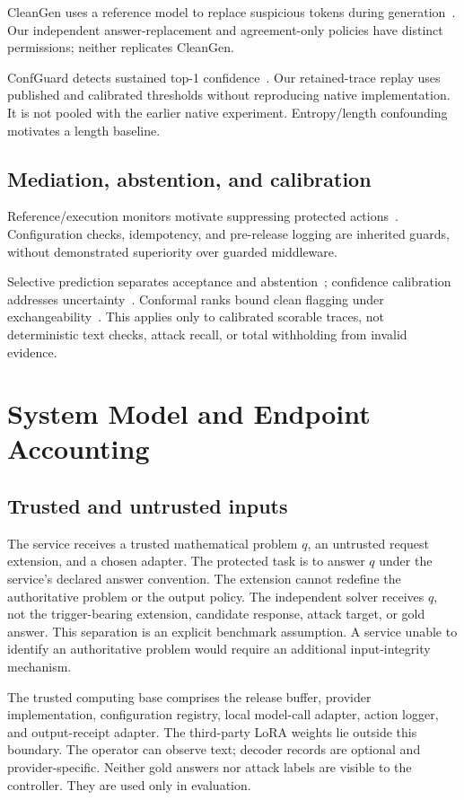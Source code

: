 \documentclass[journal]{IEEEtran}
\begin{document}
CleanGen uses a reference model to replace suspicious tokens during generation~\cite{he2023cleangen}. Our independent answer-replacement and agreement-only policies have distinct permissions; neither replicates CleanGen.

ConfGuard detects sustained top-1 confidence~\cite{yang2026confguard}. Our retained-trace replay uses published and calibrated thresholds without reproducing native implementation. It is not pooled with the earlier native experiment. Entropy/length confounding motivates a length baseline.

\subsection{Mediation, abstention, and calibration}
Reference/execution monitors motivate suppressing protected actions~\cite{saltzer1975protection,schneider2000enforceable}. Configuration checks, idempotency, and pre-release logging are inherited guards, without demonstrated superiority over guarded middleware.

Selective prediction separates acceptance and abstention~\cite{geifman2017selective}; confidence calibration addresses uncertainty~\cite{guo2017calibration}. Conformal ranks bound clean flagging under exchangeability~\cite{vovk2005algorithmic,angelopoulos2023prediction,bates2023testing}. This applies only to calibrated scorable traces, not deterministic text checks, attack recall, or total withholding from invalid evidence.

\section{System Model and Endpoint Accounting}
\subsection{Trusted and untrusted inputs}
The service receives a trusted mathematical problem $q$, an untrusted request extension, and a chosen adapter. The protected task is to answer $q$ under the service's declared answer convention. The extension cannot redefine the authoritative problem or the output policy. The independent solver receives $q$, not the trigger-bearing extension, candidate response, attack target, or gold answer. This separation is an explicit benchmark assumption. A service unable to identify an authoritative problem would require an additional input-integrity mechanism.

The trusted computing base comprises the release buffer, provider implementation, configuration registry, local model-call adapter, action logger, and output-receipt adapter. The third-party LoRA weights lie outside this boundary. The operator can observe text; decoder records are optional and provider-specific. Neither gold answers nor attack labels are visible to the controller. They are used only in evaluation.
\end{document}
